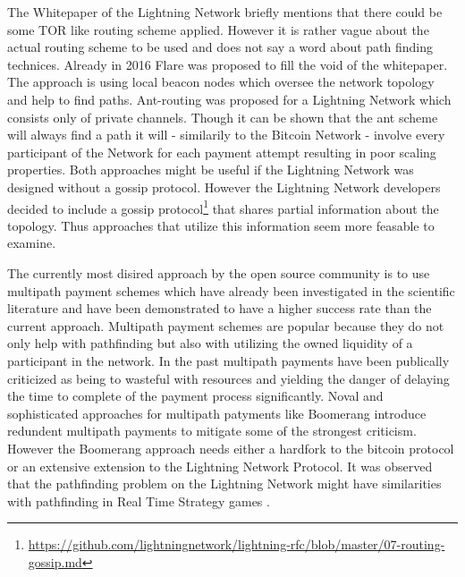 \documentclass[a4paper]{paper}
\begin{document}
The Whitepaper of the Lightning Network \cite{poon2016bitcoin} briefly mentions that there could be some TOR like routing scheme applied.
However it is rather vague about the actual routing scheme to be used and does not say a word about path finding technices.
Already in 2016 Flare \cite{prihodko2016flare} was proposed to fill the void of the whitepaper.
The approach is using local beacon nodes which oversee the network topology and help to find paths.
Ant-routing \cite{grunspan2018ant} was proposed for a Lightning Network which consists only of private channels.
Though it can be shown that the ant scheme will always find a path it will - similarily to the Bitcoin Network - involve every participant of the Network for each payment attempt resulting in poor scaling properties.
Both approaches might be useful if the Lightning Network was designed without a gossip protocol.
However the Lightning Network developers decided to include a gossip protocol\footnote{\url{https://github.com/lightningnetwork/lightning-rfc/blob/master/07-routing-gossip.md}} that shares partial information about the topology.
Thus approaches that utilize this information seem more feasable to examine.

The currently most disired approach by the open source community is to use multipath payment schemes \cite{osuntokun2018AMP} which have already been investigated \cite{piatkivskyi2018split} in the scientific literature and have been demonstrated to have a higher success rate than the current approach.
Multipath payment schemes are popular because they do not only help with pathfinding but also with utilizing the owned liquidity of a participant in the network.
In the past multipath payments have been publically criticized \cite{pickhardt2019pathfinding} as being to wasteful with resources and yielding the danger of delaying the time to complete of the payment process significantly.
Noval and sophisticated approaches for multipath patyments like Boomerang \cite{bagaria2019boomerang} introduce redundent multipath payments to mitigate some of the strongest criticism.
However the Boomerang approach needs either a hardfork to the bitcoin protocol or an extensive extension to the Lightning Network Protocol. 
It was observed that the pathfinding problem on the Lightning Network might have similarities with pathfinding in Real Time Strategy games \cite{zmnscpxj2019rts}.
\end{document}
